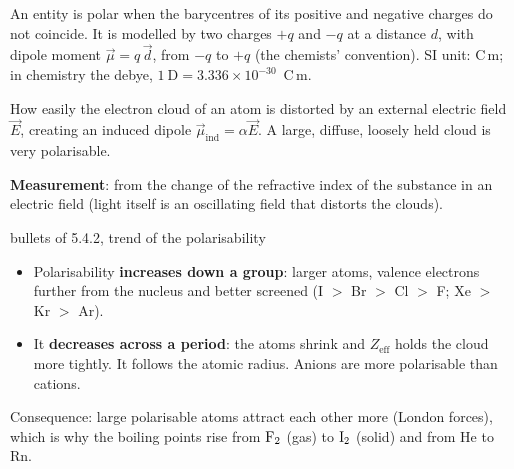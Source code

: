 \begin{concept}
An entity is polar when the barycentres of its positive and negative charges do not coincide. It is
modelled by two charges $+q$ and $-q$ at a distance $d$, with dipole moment
$\boxed{\vec\mu = q\,\vec d}$, from $-q$ to $+q$ (the chemists' convention). SI unit: C\,m; in chemistry the
debye, $1\ \mathrm D = 3.336\times10^{-30}$~C\,m.
\end{concept}
\begin{concept}
How easily the electron cloud of an atom is distorted by an external electric field $\vec E$, creating an
induced dipole $\vec\mu_\mathrm{ind} = \alpha\vec E$. A large, diffuse, loosely held cloud is very
polarisable.
\end{concept}
\textbf{Measurement}: from the change of the refractive index of the substance in an electric field
(light itself is an oscillating field that distorts the clouds).
\begin{handout}{bullets of 5.4.2, trend of the polarisability}
\begin{itemize}
  \item Polarisability \textbf{increases down a group}: larger atoms, valence electrons further from the
        nucleus and better screened (I $>$ Br $>$ Cl $>$ F; Xe $>$ Kr $>$ Ar).
  \item It \textbf{decreases across a period}: the atoms shrink and $Z_\mathrm{eff}$ holds the cloud
        more tightly. It follows the atomic radius. Anions are more polarisable than cations.
\end{itemize}
\end{handout}
Consequence: large polarisable atoms attract each other more (London forces), which is why the boiling
points rise from $\ce{F2}$ (gas) to $\ce{I2}$ (solid) and from He to Rn.

